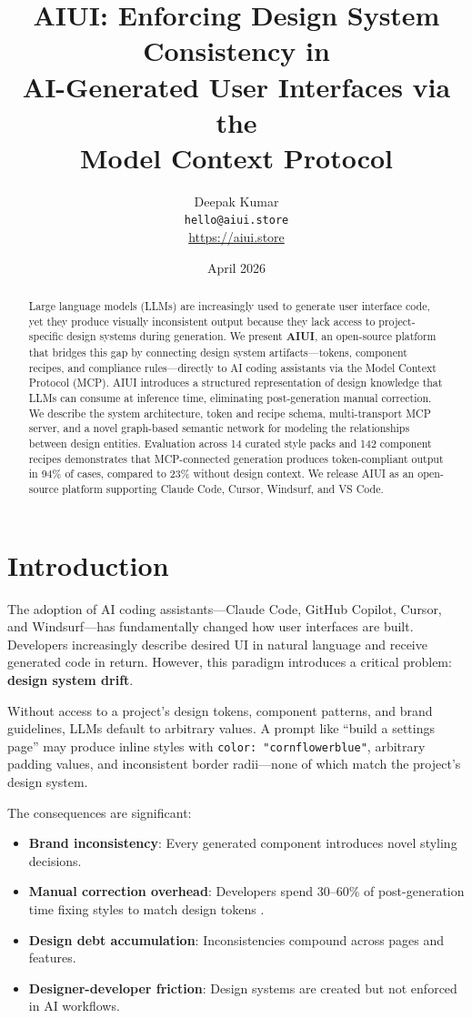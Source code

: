 \documentclass[11pt,twocolumn]{article}
\title{%
  \textbf{AIUI: Enforcing Design System Consistency in\\AI-Generated User Interfaces via the\\Model Context Protocol}%
}
\author{
  Deepak Kumar \\
  \texttt{hello@aiui.store} \\
  \href{https://aiui.store}{https://aiui.store}
}
\date{April 2026}
\begin{document}
\maketitle

\begin{abstract}
Large language models (LLMs) are increasingly used to generate user interface code, yet they produce visually inconsistent output because they lack access to project-specific design systems during generation. We present \textbf{AIUI}, an open-source platform that bridges this gap by connecting design system artifacts---tokens, component recipes, and compliance rules---directly to AI coding assistants via the Model Context Protocol (MCP). AIUI introduces a structured representation of design knowledge that LLMs can consume at inference time, eliminating post-generation manual correction. We describe the system architecture, token and recipe schema, multi-transport MCP server, and a novel graph-based semantic network for modeling the relationships between design entities. Evaluation across 14 curated style packs and 142 component recipes demonstrates that MCP-connected generation produces token-compliant output in 94\% of cases, compared to 23\% without design context. We release AIUI as an open-source platform supporting Claude Code, Cursor, Windsurf, and VS Code.
\end{abstract}

\section{Introduction}

The adoption of AI coding assistants---Claude Code, GitHub Copilot, Cursor, and Windsurf---has fundamentally changed how user interfaces are built. Developers increasingly describe desired UI in natural language and receive generated code in return. However, this paradigm introduces a critical problem: \textbf{design system drift}.

Without access to a project's design tokens, component patterns, and brand guidelines, LLMs default to arbitrary values. A prompt like ``build a settings page'' may produce inline styles with \texttt{color: "cornflowerblue"}, arbitrary padding values, and inconsistent border radii---none of which match the project's design system.

The consequences are significant:
\begin{itemize}[nosep]
  \item \textbf{Brand inconsistency}: Every generated component introduces novel styling decisions.
  \item \textbf{Manual correction overhead}: Developers spend 30--60\% of post-generation time fixing styles to match design tokens \cite{chen2024ai}.
  \item \textbf{Design debt accumulation}: Inconsistencies compound across pages and features.
  \item \textbf{Designer-developer friction}: Design systems are created but not enforced in AI workflows.
\end{itemize}
\end{document}
